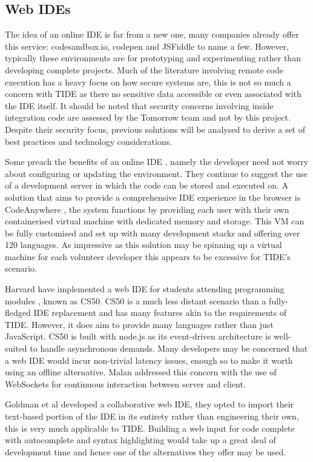 \documentclass[jou,apacite]{apa6}
\begin{document}
\subsection{Web IDEs}
The idea of an online IDE is far from a new one, many companies already offer this service: codesandbox.io, codepen and JSFiddle to name a few. However, typically these environments are for prototyping and experimenting rather than developing complete projects. Much of the literature involving remote code execution has a heavy focus on how secure systems are, this is not so much a concern with TIDE as there no sensitive data accessible or even associated with the IDE itself. It should be noted that security concerns involving inside integration code are assessed by the Tomorrow team and not by this project. Despite their security focus, previous solutions will be analysed to derive a set of best practices and technology considerations.

Some preach the benefits of an online IDE \cite{Aho2011}, namely the developer need not worry about configuring or updating the environment. They continue to suggest the use of a development server in which the code can be stored and executed on. A solution that aims to provide a comprehensive IDE experience in the browser is CodeAnywhere \cite{codeanywhere}, the system functions by providing each user with their own containerised virtual machine with dedicated memory and storage. This VM can be fully customised and set up with many development stacks and offering over 120 languages. As impressive as this solution may be spinning up a virtual machine for each volunteer developer this appears to be excessive for TIDE's scenario. 

Harvard have implemented a web IDE for students attending programming modules \cite{Malan2013}, known as CS50. CS50 is a much less distant scenario than a fully-fledged IDE  replacement and has many features akin to the requirements of TIDE. However, it does aim to provide many languages rather than just JavaScript. CS50 is built with node.js as its event-driven architecture is well-suited to handle asynchronous demands. Many developers may be concerned that a web IDE would incur non-trivial latency issues, enough so to make it worth using an offline alternative. Malan addressed this concern with the use of WebSockets for continuous interaction between server and client.

Goldman et al \cite{Goldman2011} developed a collaborative web IDE, they opted to import their text-based portion of the IDE in its entirety rather than engineering their own, this is very much applicable to TIDE. Building a web input for code complete with autocomplete and syntax highlighting would take up a great deal of development time and hence one of the alternatives they offer may be used. 
\end{document}
